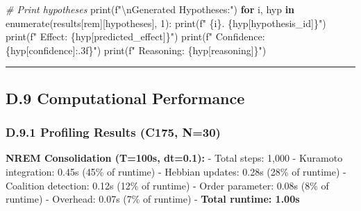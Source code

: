 \documentclass[
]{article}
\newenvironment{Shaded}{}{}
\newcommand{\BuiltInTok}[1]{\textcolor[rgb]{0.00,0.50,0.00}{#1}}
\newcommand{\CharTok}[1]{\textcolor[rgb]{0.25,0.44,0.63}{#1}}
\newcommand{\CommentTok}[1]{\textcolor[rgb]{0.38,0.63,0.69}{\textit{#1}}}
\newcommand{\ControlFlowTok}[1]{\textcolor[rgb]{0.00,0.44,0.13}{\textbf{#1}}}
\newcommand{\DecValTok}[1]{\textcolor[rgb]{0.25,0.63,0.44}{#1}}
\newcommand{\KeywordTok}[1]{\textcolor[rgb]{0.00,0.44,0.13}{\textbf{#1}}}
\newcommand{\NormalTok}[1]{#1}
\newcommand{\SpecialCharTok}[1]{\textcolor[rgb]{0.25,0.44,0.63}{#1}}
\newcommand{\SpecialStringTok}[1]{\textcolor[rgb]{0.73,0.40,0.53}{#1}}
\newcommand{\StringTok}[1]{\textcolor[rgb]{0.25,0.44,0.63}{#1}}
\begin{document}
\begin{Shaded}
\begin{Highlighting}[]
    \CommentTok{\# Print hypotheses}
    \BuiltInTok{print}\NormalTok{(}\SpecialStringTok{f"}\CharTok{\textbackslash{}n}\SpecialStringTok{Generated Hypotheses:"}\NormalTok{)}
    \ControlFlowTok{for}\NormalTok{ i, hyp }\KeywordTok{in} \BuiltInTok{enumerate}\NormalTok{(results[}\StringTok{\textquotesingle{}rem\textquotesingle{}}\NormalTok{][}\StringTok{\textquotesingle{}hypotheses\textquotesingle{}}\NormalTok{], }\DecValTok{1}\NormalTok{):}
        \BuiltInTok{print}\NormalTok{(}\SpecialStringTok{f"  }\SpecialCharTok{\{}\NormalTok{i}\SpecialCharTok{\}}\SpecialStringTok{. }\SpecialCharTok{\{}\NormalTok{hyp[}\StringTok{\textquotesingle{}hypothesis\_id\textquotesingle{}}\NormalTok{]}\SpecialCharTok{\}}\SpecialStringTok{"}\NormalTok{)}
        \BuiltInTok{print}\NormalTok{(}\SpecialStringTok{f"     Effect: }\SpecialCharTok{\{}\NormalTok{hyp[}\StringTok{\textquotesingle{}predicted\_effect\textquotesingle{}}\NormalTok{]}\SpecialCharTok{\}}\SpecialStringTok{"}\NormalTok{)}
        \BuiltInTok{print}\NormalTok{(}\SpecialStringTok{f"     Confidence: }\SpecialCharTok{\{}\NormalTok{hyp[}\StringTok{\textquotesingle{}confidence\textquotesingle{}}\NormalTok{]}\SpecialCharTok{:.3f\}}\SpecialStringTok{"}\NormalTok{)}
        \BuiltInTok{print}\NormalTok{(}\SpecialStringTok{f"     Reasoning: }\SpecialCharTok{\{}\NormalTok{hyp[}\StringTok{\textquotesingle{}reasoning\textquotesingle{}}\NormalTok{]}\SpecialCharTok{\}}\SpecialStringTok{"}\NormalTok{)}
\end{Highlighting}
\end{Shaded}

\begin{center}\rule{0.5\linewidth}{0.5pt}\end{center}

\subsection{D.9 Computational
Performance}\label{d.9-computational-performance}

\subsubsection{D.9.1 Profiling Results (C175,
N=30)}\label{d.9.1-profiling-results-c175-n30}

\textbf{NREM Consolidation (T=100s, dt=0.1):} - Total steps: 1,000 -
Kuramoto integration: 0.45s (45\% of runtime) - Hebbian updates: 0.28s
(28\% of runtime) - Coalition detection: 0.12s (12\% of runtime) - Order
parameter: 0.08s (8\% of runtime) - Overhead: 0.07s (7\% of runtime) -
\textbf{Total runtime: 1.00s}
\end{document}

